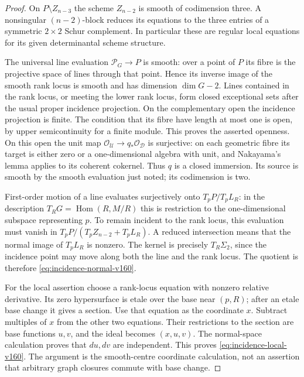 \documentclass[11pt,reqno]{amsart}
\numberwithin{equation}{section}
\theoremstyle{definition}\newtheorem{definition}[theorem]{Definition}
\theoremstyle{remark}\newtheorem{remark}[theorem]{Remark}
\newcommand{\OO}{\mathcal O}\newcommand{\II}{\mathcal I}
\DeclareMathOperator{\Hom}{Hom}\DeclareMathOperator{\Tot}{Tot}
\begin{document}
\begin{proof}
On $P\setminus Z_{n-3}$ the scheme $Z_{n-2}$ is smooth of codimension
three. A nonsingular $(n-2)$-block reduces its equations to the three
entries of a symmetric $2\times2$ Schur complement. In particular
these are regular local equations for its given determinantal scheme
structure.

The universal line evaluation $\mathcal P_G\to P$ is smooth: over a
point of $P$ its fibre is the projective space of lines through that
point. Hence its inverse image of the smooth rank locus is smooth
and has dimension $\dim G-2$. Lines contained in the rank locus, or
meeting the lower rank locus, form closed exceptional sets after the
usual proper incidence projection. On the complementary open the
incidence projection is finite. The condition that its fibre have
length at most one is open, by upper semicontinuity for a finite
module. This proves the asserted openness. On this open the unit map
$\OO_{\mathcal U}\to q_*\OO_{\mathcal D}$ is surjective: on each
geometric fibre its target is either zero or a one-dimensional
algebra with unit, and Nakayama's lemma applies to its coherent
cokernel. Thus $q$ is a closed immersion. Its source is smooth by the
smooth evaluation just noted; its codimension is two.

First-order motion of a line evaluates surjectively onto
$T_pP/T_pL_R$: in the description
$T_RG=\Hom(R,M/R)$ this is restriction to the one-dimensional
subspace representing $p$. To remain incident to the rank locus,
this evaluation must vanish in $T_pP/(T_pZ_{n-2}+T_pL_R)$.
A reduced intersection means that the normal image of $T_pL_R$ is
nonzero. The kernel is precisely $T_R\Sigma_2$, since the incidence
point may move along both the line and the rank locus. The quotient
is therefore \eqref{eq:incidence-normal-v160}.

For the local assertion choose a rank-locus equation with nonzero
relative derivative. Its zero hypersurface is etale over the base
near $(p,R)$; after an etale base change it gives a section. Use that
equation as the coordinate $x$. Subtract multiples of $x$ from the
other two equations. Their restrictions to the section are base
functions $u,v$, and the ideal becomes $(x,u,v)$. The normal-space
calculation proves that $du,dv$ are independent. This proves
\eqref{eq:incidence-local-v160}. The argument is the smooth-centre
coordinate calculation, not an assertion that arbitrary graph
closures commute with base change.
\end{proof}
\end{document}

